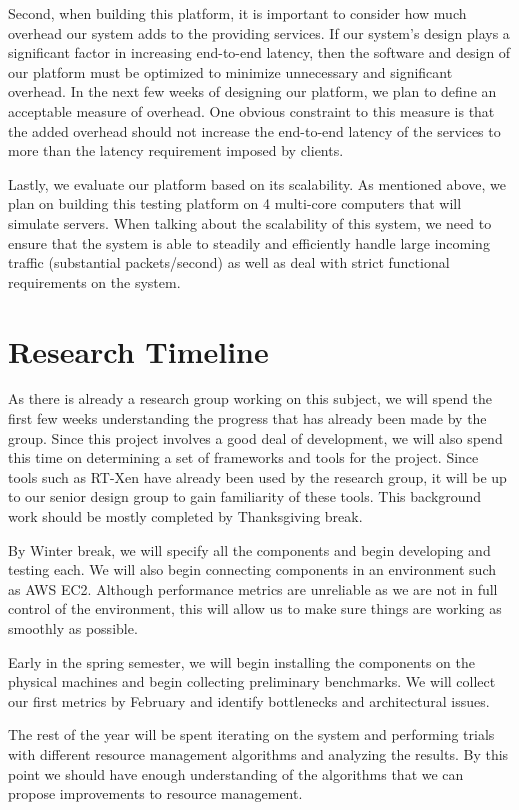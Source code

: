 \documentclass{sig-alternate}
\begin{document}
	Second, when building this platform, it is important to consider how much overhead our system adds to the providing services. If our system’s design plays a significant factor in increasing end-to-end latency, then the software and design of our platform must be optimized to minimize unnecessary and significant overhead. In the next few weeks of designing our platform, we plan to define an acceptable measure of overhead. One obvious constraint to this measure is that the added overhead should not increase the end-to-end latency of the services to more than the latency requirement imposed by clients. 
	
	Lastly, we evaluate our platform based on its scalability. As mentioned above, we plan on building this testing platform on 4 multi-core computers that will simulate servers. When talking about the scalability of this system, we need to ensure that the system is able to steadily and efficiently handle large incoming traffic (substantial packets/second) as well as deal with strict functional requirements on the system.


\section{Research Timeline}
\label{sec:research_timeline}
As there is already a research group working on this subject, we will spend the first few weeks understanding the progress that has already been made by the group. Since this project involves a good deal of development, we will also spend this time on determining a set of frameworks and tools for the project. Since tools such as RT-Xen have already been used by the research group, it will be up to our senior design group to gain familiarity of these tools. This background work should be mostly completed by Thanksgiving break.

By Winter break, we will specify all the components and begin developing and testing each. We will also begin connecting components in an environment such as AWS EC2. Although performance metrics are unreliable as we are not in full control of the environment, this will allow us to make sure things are working as smoothly as possible.

Early in the spring semester, we will begin installing the components on the physical machines and begin collecting preliminary benchmarks. We will collect our first metrics by February and identify bottlenecks and architectural issues.

The rest of the year will be spent iterating on the system and performing trials with different resource management algorithms and analyzing the results. By this point we should have enough understanding of the algorithms that we can propose improvements to resource management.
\end{document}

